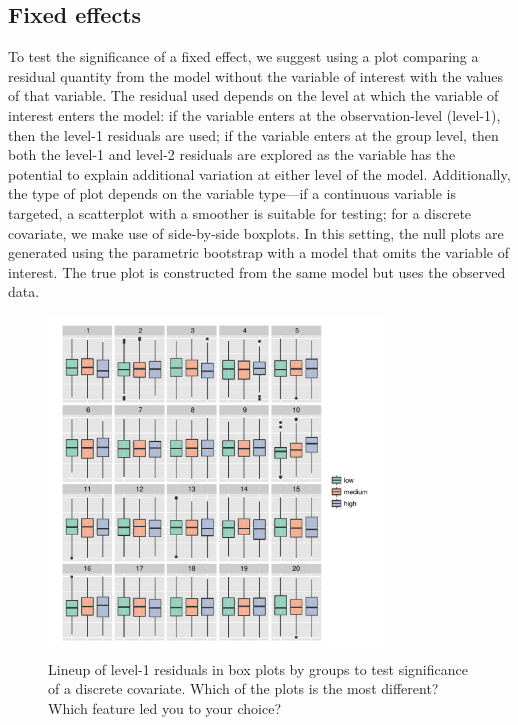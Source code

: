 \documentclass[12pt]{article} %
\newcommand{\hh}[1]{{\color{orange} #1}}
\newcommand{\alnote}[1]{\todo[inline,color=green!40]{#1}} %
\begin{document}
\subsection{Fixed effects} 
To test the significance of a fixed effect, we suggest using a plot comparing a residual quantity from the model without the variable of interest with the values of that variable. 
The residual used depends on the level at which the variable of interest enters the model: if the variable enters at the observation-level (level-1), then the level-1 residuals are used; if the variable enters at the group level, then both the level-1 and level-2 residuals are explored as the variable has the potential to explain additional variation at either level of the model.
Additionally, the type of plot depends on the variable type---if a continuous variable is targeted,  a scatterplot with a smoother is suitable for testing; for a discrete covariate, we make use of side-by-side boxplots. 
In this setting, the null plots are generated using the parametric bootstrap  with a model that omits the variable of interest. The true plot is constructed from the same model but uses the observed data. 

\begin{figure}[h]
	\centering
	\includegraphics[width=0.8\textwidth]{autism2-ordered-10.pdf}
	\caption{\label{fig:boxplot-ordered} \hh{Lineup of level-1 residuals in box plots  by groups to test significance of a discrete covariate.}
	Which of the plots is the most different? Which feature led you to your choice?} 
\end{figure}
\end{document}
